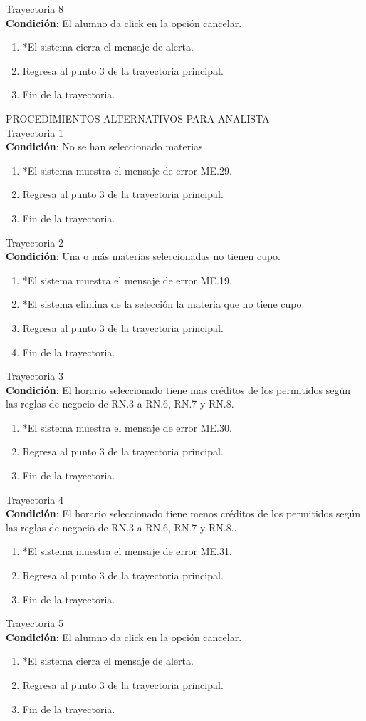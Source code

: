 \large{Trayectoria 8}\\
\textbf{Condición}: El alumno da click en la opción cancelar.
\begin{enumerate}
    \item *El sistema cierra el mensaje de alerta.
    \item Regresa al punto 3 de la trayectoria principal.
    \item Fin de la trayectoria.
\end{enumerate}
\newpage
\Large{PROCEDIMIENTOS ALTERNATIVOS PARA ANALISTA}\\
\large{Trayectoria 1}\\
\textbf{Condición}: No se han seleccionado materias.
\begin{enumerate}
    \item *El sistema muestra el mensaje de error ME.29.
    \item Regresa al punto 3 de la trayectoria principal.
    \item Fin de la trayectoria.
\end{enumerate}
\large{Trayectoria 2}\\
\textbf{Condición}: Una o más materias seleccionadas no tienen cupo.
\begin{enumerate}
    \item *El sistema muestra el mensaje de error ME.19.
    \item *El sistema elimina de la selección la materia que no tiene cupo.
    \item Regresa al punto 3 de la trayectoria principal.
    \item Fin de la trayectoria.
\end{enumerate}
\large{Trayectoria 3}\\
\textbf{Condición}: El horario seleccionado tiene mas créditos de los permitidos según las reglas de negocio de RN.3 a RN.6, RN.7 y RN.8.
\begin{enumerate}
    \item *El sistema muestra el mensaje de error ME.30.
    \item Regresa al punto 3 de la trayectoria principal.
    \item Fin de la trayectoria.
\end{enumerate}
\large{Trayectoria 4}\\
\textbf{Condición}: El horario seleccionado tiene menos créditos de los permitidos según las reglas de negocio de RN.3 a RN.6, RN.7 y RN.8..
\begin{enumerate}
    \item *El sistema muestra el mensaje de error ME.31.
    \item Regresa al punto 3 de la trayectoria principal.
    \item Fin de la trayectoria.
\end{enumerate}
\large{Trayectoria 5}\\
\textbf{Condición}: El alumno da click en la opción cancelar.
\begin{enumerate}
    \item *El sistema cierra el mensaje de alerta.
    \item Regresa al punto 3 de la trayectoria principal.
    \item Fin de la trayectoria.
\end{enumerate}